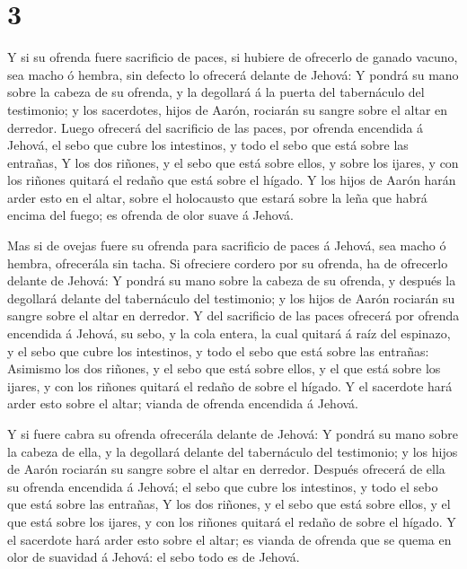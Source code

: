 \hypertarget{section-2}{%
\section{3}\label{section-2}}

 Y si su ofrenda fuere sacrificio de paces, si hubiere de
ofrecerlo de ganado vacuno, sea macho ó hembra, sin defecto lo ofrecerá
delante de Jehová:  Y pondrá su mano sobre la cabeza de su
ofrenda, y la degollará á la puerta del tabernáculo del testimonio; y
los sacerdotes, hijos de Aarón, rociarán su sangre sobre el altar en
derredor.  Luego ofrecerá del sacrificio de las paces, por
ofrenda encendida á Jehová, el sebo que cubre los intestinos, y todo el
sebo que está sobre las entrañas,  Y los dos riñones, y el
sebo que está sobre ellos, y sobre los ijares, y con los riñones quitará
el redaño que está sobre el hígado.  Y los hijos de Aarón
harán arder esto en el altar, sobre el holocausto que estará sobre la
leña que habrá encima del fuego; es ofrenda de olor suave á Jehová.

 Mas si de ovejas fuere su ofrenda para sacrificio de paces
á Jehová, sea macho ó hembra, ofrecerála sin tacha.  Si
ofreciere cordero por su ofrenda, ha de ofrecerlo delante de Jehová:
 Y pondrá su mano sobre la cabeza de su ofrenda, y después
la degollará delante del tabernáculo del testimonio; y los hijos de
Aarón rociarán su sangre sobre el altar en derredor.  Y del
sacrificio de las paces ofrecerá por ofrenda encendida á Jehová, su
sebo, y la cola entera, la cual quitará á raíz del espinazo, y el sebo
que cubre los intestinos, y todo el sebo que está sobre las entrañas:
 Asimismo los dos riñones, y el sebo que está sobre ellos,
y el que está sobre los ijares, y con los riñones quitará el redaño de
sobre el hígado.  Y el sacerdote hará arder esto sobre el
altar; vianda de ofrenda encendida á Jehová.

 Y si fuere cabra su ofrenda ofrecerála delante de Jehová:
 Y pondrá su mano sobre la cabeza de ella, y la degollará
delante del tabernáculo del testimonio; y los hijos de Aarón rociarán su
sangre sobre el altar en derredor.  Después ofrecerá de
ella su ofrenda encendida á Jehová; el sebo que cubre los intestinos, y
todo el sebo que está sobre las entrañas,  Y los dos
riñones, y el sebo que está sobre ellos, y el que está sobre los ijares,
y con los riñones quitará el redaño de sobre el hígado.  Y
el sacerdote hará arder esto sobre el altar; es vianda de ofrenda que se
quema en olor de suavidad á Jehová: el sebo todo es de Jehová.

